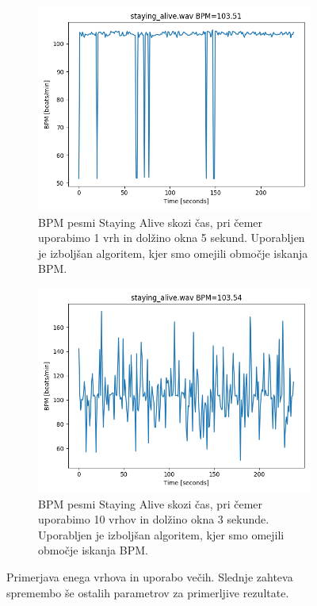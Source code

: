 \documentclass[a4paper,11pt]{article}
\begin{document}
\begin{figure}
\centering
\begin{subfigure}{0.48\textwidth}
\includegraphics[width=\linewidth]{images/sa_bpm_p1_new.png}
\caption{BPM pesmi Staying Alive skozi čas, pri čemer uporabimo 1 vrh in dolžino okna 5 sekund. Uporabljen je izboljšan algoritem, kjer smo omejili območje iskanja BPM.} \label{sa_bpm_1}
\end{subfigure}
\hspace*{\fill} %
\begin{subfigure}{0.48\textwidth}
\includegraphics[width=\linewidth]{images/sa_bpm_p10_w3_new.png}
\caption{BPM pesmi Staying Alive skozi čas, pri čemer uporabimo 10 vrhov in dolžino okna 3 sekunde. Uporabljen je izboljšan algoritem, kjer smo omejili območje iskanja BPM.} \label{sa_bpm_10}
\end{subfigure}

\caption{Primerjava enega vrhova in uporabo večih. Slednje zahteva spremembo še ostalih parametrov za primerljive rezultate.} \label{sa_bpm_peak_cmp}
\end{figure}
\end{document}
